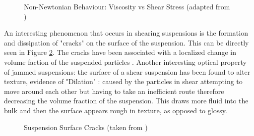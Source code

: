 \documentclass[a4]{report}
\begin{document}
	\begin{figure}[!htb]
		\centering
		\label{figshearthinthick}
		\caption{Non-Newtonian Behaviour: Viscosity vs Shear Stress (adapted from \cite{figshearthin, figshearthick})}
	\end{figure} \newline  \noindent
	An interesting phenomenon that occurs in shearing suspensions is the formation and dissipation of "cracks" on the surface of the suspension. This can be directly seen in Figure \ref{cforscracks}. The cracks have been associated with a localized change in volume faction of the suspended particles \cite{backhawjam}. Another interesting optical property of jammed suspensions: the surface of a shear suspension has been found to alter texture, evidence of "Dilation" \cite{backbrownjaegrev}: caused by the particles in shear attempting to move around each other but having to take an inefficient route therefore decreasing the volume fraction of the suspension. This draws more fluid into the bulk and then the surface appears rough in texture, as opposed to glossy. 
	\newline \newline \noindent
	\begin{figure}[!htb]
		\centering
		\caption{Suspension Surface Cracks (taken from \cite[p.~118]{thescforsyth})}
		\label{cforscracks}
	\end{figure} \newline  \noindent
\end{document}
